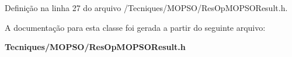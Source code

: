 Definição na linha 27 do arquivo /\+Tecniques/\+M\+O\+P\+S\+O/\+Res\+Op\+M\+O\+P\+S\+O\+Result.\+h.



A documentação para esta classe foi gerada a partir do seguinte arquivo\+:\begin{DoxyCompactItemize}
\item 
{\bf Tecniques/\+M\+O\+P\+S\+O/\+Res\+Op\+M\+O\+P\+S\+O\+Result.\+h}\end{DoxyCompactItemize}
